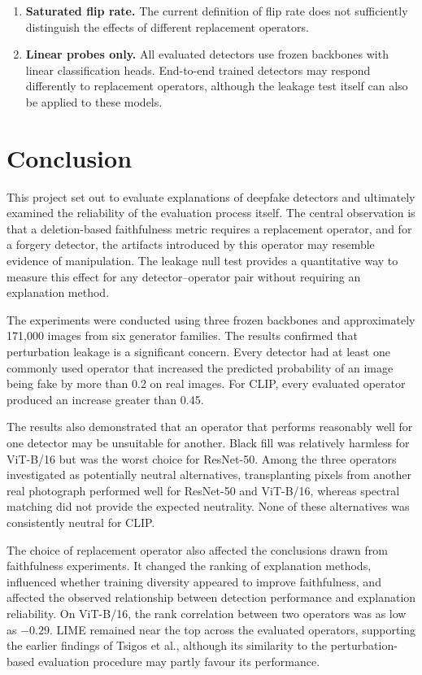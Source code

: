 \begin{enumerate}
    \item \textbf{Saturated flip rate.}
    The current definition of flip rate does not sufficiently
    distinguish the effects of different replacement operators.

    \item \textbf{Linear probes only.}
    All evaluated detectors use frozen backbones with linear
    classification heads. End-to-end trained detectors may respond
    differently to replacement operators, although the leakage test
    itself can also be applied to these models.
\end{enumerate}

\section{Conclusion}

This project set out to evaluate explanations of deepfake detectors
and ultimately examined the reliability of the evaluation process
itself. The central observation is that a deletion-based faithfulness
metric requires a replacement operator, and for a forgery detector,
the artifacts introduced by this operator may resemble evidence of
manipulation. The leakage null test provides a quantitative way to
measure this effect for any detector--operator pair without requiring
an explanation method.

The experiments were conducted using three frozen backbones and
approximately 171,000 images from six generator families. The results
confirmed that perturbation leakage is a significant concern. Every
detector had at least one commonly used operator that increased the
predicted probability of an image being fake by more than 0.2 on real
images. For CLIP, every evaluated operator produced an increase
greater than 0.45.

The results also demonstrated that an operator that performs
reasonably well for one detector may be unsuitable for another.
Black fill was relatively harmless for ViT-B/16 but was the worst
choice for ResNet-50. Among the three operators investigated as
potentially neutral alternatives, transplanting pixels from another
real photograph performed well for ResNet-50 and ViT-B/16, whereas
spectral matching did not provide the expected neutrality. None of
these alternatives was consistently neutral for CLIP.

The choice of replacement operator also affected the conclusions
drawn from faithfulness experiments. It changed the ranking of
explanation methods, influenced whether training diversity appeared
to improve faithfulness, and affected the observed relationship
between detection performance and explanation reliability. On
ViT-B/16, the rank correlation between two operators was as low as
$-0.29$. LIME remained near the top across the evaluated operators,
supporting the earlier findings of Tsigos et al., although its
similarity to the perturbation-based evaluation procedure may partly
favour its performance.

